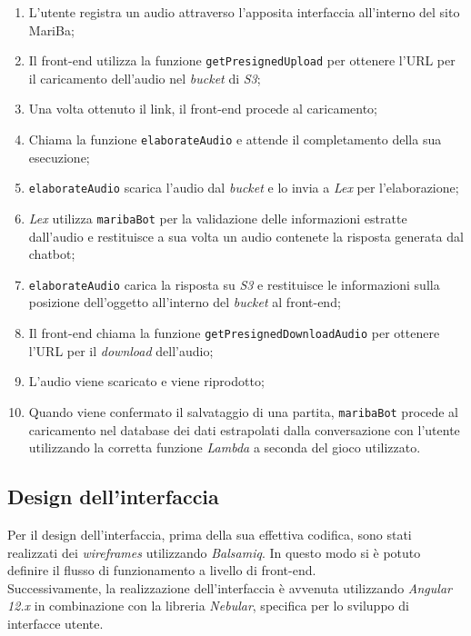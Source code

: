 	\begin{enumerate}
		\item L'utente registra un audio attraverso l'apposita interfaccia all'interno del sito MariBa;
		\item Il front-end utilizza la funzione \texttt{getPresignedUpload} per ottenere l'URL per il caricamento dell'audio nel \emph{bucket} di \emph{S3};
		\item Una volta ottenuto il link, il front-end procede al caricamento;
		\item Chiama la funzione \texttt{elaborateAudio} e attende il completamento della sua esecuzione;
		\item \texttt{elaborateAudio} scarica l'audio dal \emph{bucket} e lo invia a \emph{Lex} per l'elaborazione;
		\item \emph{Lex} utilizza \texttt{maribaBot} per la validazione delle informazioni estratte dall'audio e restituisce a sua volta un audio contenete la risposta generata dal \gls{chatbot};
		\item \texttt{elaborateAudio} carica la risposta su \emph{S3} e restituisce le informazioni sulla posizione dell'oggetto all'interno del \emph{bucket} al front-end;
		\item Il front-end chiama la funzione \texttt{getPresignedDownloadAudio} per ottenere l'URL per il \emph{download} dell'audio;
		\item L'audio viene scaricato e viene riprodotto;
		\item Quando viene confermato il salvataggio di una partita, \texttt{maribaBot} procede al caricamento nel database dei dati estrapolati dalla conversazione con l'utente utilizzando la corretta funzione \emph{Lambda} a seconda del gioco utilizzato.
	\end{enumerate}
	
	\subsection{Design dell'interfaccia}
	Per il design dell'interfaccia, prima della sua effettiva codifica, sono stati realizzati dei \emph{wireframes} utilizzando \emph{Balsamiq}. In questo modo si è potuto definire il flusso di funzionamento a livello di front-end. \\ 
	
	\noindent Successivamente, la realizzazione dell'interfaccia è avvenuta utilizzando \emph{Angular 12.x} in combinazione con la libreria 
	\emph{Nebular}, specifica per lo sviluppo di interfacce utente. \\
	
